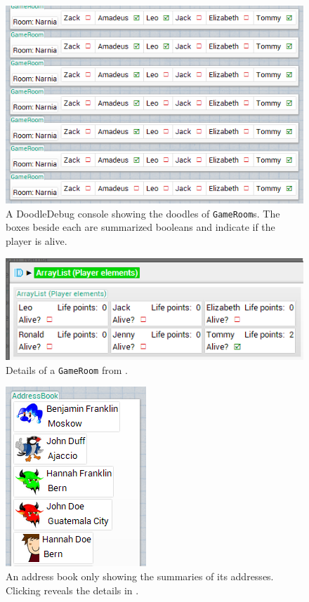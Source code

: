 \documentclass[english]{scrartcl}
\begin{document}
\begin{figure}[h]
	\includegraphics[width=\linewidth]{img/game_long-list.png}
	\caption[Example of a chronological sequence: Game]{A DoodleDebug console showing the doodles of \texttt{GameRoom}s. The boxes beside each are summarized booleans and indicate if the player is alive.}
\end{figure}

\begin{figure}[h]
	\includegraphics[width=\linewidth]{img/game_last-state.png}
	\caption[Example of a chronological sequence: Detailed player list]{Details of a \texttt{GameRoom} from .}
\end{figure}

\begin{figure}[h]
	\includegraphics{img/AddressBook_whole.png}
	\caption[AddressBook visualization]{An address book only showing the summaries of its addresses. Clicking reveals the details in .}
\end{figure}
\end{document}
